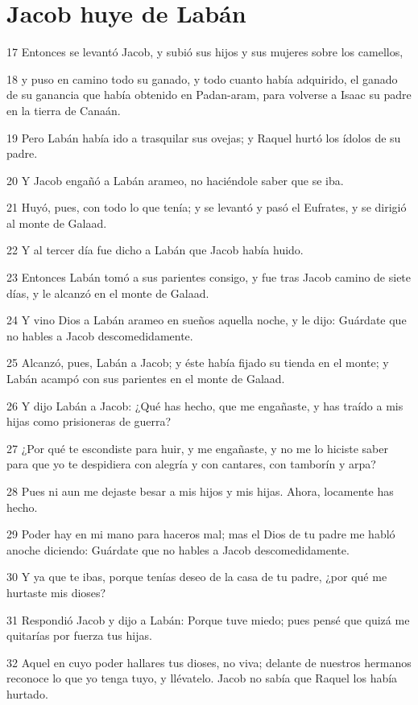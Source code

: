 \section*{Jacob huye de Labán}

\par 17 Entonces se levantó Jacob, y subió sus hijos y sus mujeres sobre los camellos,
\par 18 y puso en camino todo su ganado, y todo cuanto había adquirido, el ganado de su ganancia que había obtenido en Padan-aram, para volverse a Isaac su padre en la tierra de Canaán.
\par 19 Pero Labán había ido a trasquilar sus ovejas; y Raquel hurtó los ídolos de su padre.
\par 20 Y Jacob engañó a Labán arameo, no haciéndole saber que se iba.
\par 21 Huyó, pues, con todo lo que tenía; y se levantó y pasó el Eufrates, y se dirigió al monte de Galaad.
\par 22 Y al tercer día fue dicho a Labán que Jacob había huido.
\par 23 Entonces Labán tomó a sus parientes consigo, y fue tras Jacob camino de siete días, y le alcanzó en el monte de Galaad.
\par 24 Y vino Dios a Labán arameo en sueños aquella noche, y le dijo: Guárdate que no hables a Jacob descomedidamente.
\par 25 Alcanzó, pues, Labán a Jacob; y éste había fijado su tienda en el monte; y Labán acampó con sus parientes en el monte de Galaad.
\par 26 Y dijo Labán a Jacob: ¿Qué has hecho, que me engañaste, y has traído a mis hijas como prisioneras de guerra?
\par 27 ¿Por qué te escondiste para huir, y me engañaste, y no me lo hiciste saber para que yo te despidiera con alegría y con cantares, con tamborín y arpa?
\par 28 Pues ni aun me dejaste besar a mis hijos y mis hijas. Ahora, locamente has hecho.
\par 29 Poder hay en mi mano para haceros mal; mas el Dios de tu padre me habló anoche diciendo: Guárdate que no hables a Jacob descomedidamente.
\par 30 Y ya que te ibas, porque tenías deseo de la casa de tu padre, ¿por qué me hurtaste mis dioses?
\par 31 Respondió Jacob y dijo a Labán: Porque tuve miedo; pues pensé que quizá me quitarías por fuerza tus hijas.
\par 32 Aquel en cuyo poder hallares tus dioses, no viva; delante de nuestros hermanos reconoce lo que yo tenga tuyo, y llévatelo. Jacob no sabía que Raquel los había hurtado.
